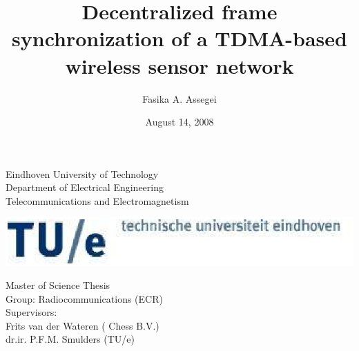\documentclass[a4paper,10pt]{report}
\title{\textbf{Decentralized frame synchronization of a TDMA-based wireless sensor network}}
\author{Fasika A. Assegei}
\date{August 14, 2008}
\begin{document}
\pagestyle{empty}
\begin{titlepage}
\begin{center}
\parbox{27cm}{
  \hspace{1cm}
  \begin{minipage}[c]{.6\textwidth}
    Eindhoven University of Technology\\
    Department of Electrical Engineering\\
    Telecommunications and Electromagnetism
  \end{minipage}
   \begin{minipage}[c]{.4\textwidth}
    \includegraphics[scale=0.5]{TUElogoCompact2}
  \end{minipage}
}
\end{center}

\begin{center}
\hspace{2cm}
\begin{minipage}[c]{16cm}
    \vspace{2.5cm}
    \centering
    \Large
    \maketitle
    \vspace{4cm}
\end{minipage}
\end{center}
\hspace{1cm}
\begin{minipage}[b]{16cm}
    Master of Science Thesis\\
    Group: Radiocommunications (ECR)\\
    Supervisors:\\
    Frits van der Wateren ( Chess B.V.) \\
    dr.ir. P.F.M. Smulders (TU/e) \\
\end{minipage}
\end{titlepage}
\end{document}
